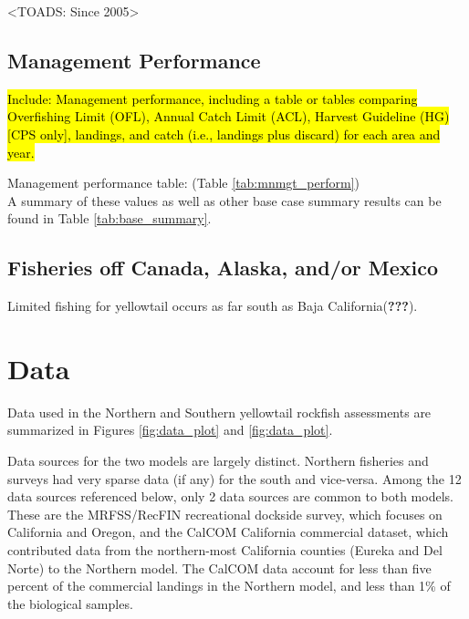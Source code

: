 \documentclass[12pt,]{article}
\begin{document}
\textless{}TOADS: Since 2005\textgreater{}

\subsection{Management Performance}\label{management-performance-1}

\hl{Include: Management performance, including a table or tables comparing 
Overfishing Limit (OFL), Annual Catch Limit (ACL), Harvest Guideline (HG) 
[CPS only], landings, and catch (i.e., landings plus discard) for each area and year.}

Management performance table: (Table \ref{tab:mnmgt_perform})\\
A summary of these values as well as other base case summary results can
be found in Table \ref{tab:base_summary}.

\subsection{Fisheries off Canada, Alaska, and/or
Mexico}\label{fisheries-off-canada-alaska-andor-mexico}

Limited fishing for yellowtail occurs as far south as Baja
California({\textbf{???}}).

\newpage

\captionsetup[table]{labelformat=empty,justification=raggedright,font=bf, singlelinecheck=false}

\section{Data}\label{data}

Data used in the Northern and Southern yellowtail rockfish assessments
are summarized in Figures \ref{fig:data_plot} and \ref{fig:data_plot}.

Data sources for the two models are largely distinct. Northern fisheries
and surveys had very sparse data (if any) for the south and vice-versa.
Among the 12 data sources referenced below, only 2 data sources are
common to both models. These are the MRFSS/RecFIN recreational dockside
survey, which focuses on California and Oregon, and the CalCOM
California commercial dataset, which contributed data from the
northern-most California counties (Eureka and Del Norte) to the Northern
model. The CalCOM data account for less than five percent of the
commercial landings in the Northern model, and less than 1\% of the
biological samples.
\end{document}
